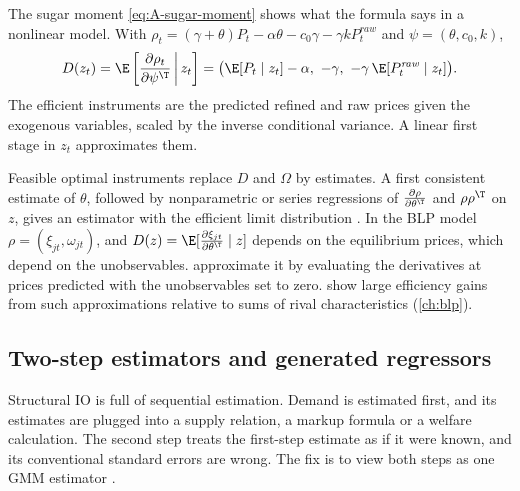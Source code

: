 The sugar moment \eqref{eq:A-sugar-moment} shows what the formula says in a nonlinear model. With
$\rho_t = (\gamma + \theta)P_t - \alpha\theta - c_0\gamma - \gamma kP^{\mathit{raw}}_t$ and $\psi = (\theta, c_0, k)$,
\begin{equation*}
  D(z_t) = \E\left[\frac{\partial\rho_t}{\partial\psi^\T}\,\middle|\, z_t\right]
  = \big(\E[P_t \mid z_t] - \alpha,\ -\gamma,\ -\gamma\,\E[P^{\mathit{raw}}_t \mid z_t]\big).
\end{equation*}
The efficient instruments are the predicted refined and raw prices given the exogenous variables, scaled by the inverse
conditional variance. A linear first stage in $z_t$ approximates them.

Feasible optimal instruments replace $D$ and $\Omega$ by estimates. A first consistent estimate of $\theta$, followed by
nonparametric or series regressions of $\frac{\partial\rho}{\partial\theta^\T}$ and $\rho\rho^\T$ on $z$, gives an estimator
with the efficient limit distribution \citep{Newey1990}. In the BLP model $\rho = (\xi_{jt}, \omega_{jt})$, and
$D(z) = \E[\frac{\partial\xi_{jt}}{\partial\theta^\T} \mid z]$ depends on the equilibrium prices, which depend on the
unobservables. \citet{BerryLevinsohnPakes1999} approximate it by evaluating the derivatives at prices predicted with the
unobservables set to zero. \citet{ReynaertVerboven2014} show large efficiency gains from such approximations relative to
sums of rival characteristics (\cref{ch:blp}).

\subsection{Two-step estimators and generated regressors}\label{sec:A-twostep}

Structural IO is full of sequential estimation. Demand is estimated first, and its estimates are plugged into a supply
relation, a markup formula or a welfare calculation. The second step treats the first-step estimate as if it were known,
and its conventional standard errors are wrong. The fix is to view both steps as one GMM estimator \citep{Newey1984,
MurphyTopel1985}.


